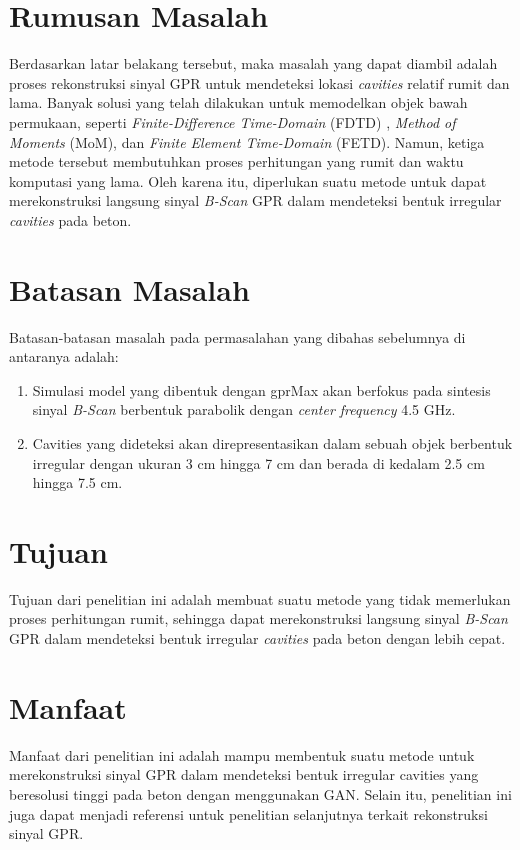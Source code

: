 \section{Rumusan Masalah}
\label{sec:rumusanmasalah}

Berdasarkan latar belakang tersebut, maka masalah yang dapat diambil adalah proses rekonstruksi sinyal GPR untuk mendeteksi lokasi \emph{cavities} relatif rumit dan lama. 
Banyak solusi yang telah dilakukan untuk memodelkan objek bawah permukaan, seperti \emph{Finite-Difference Time-Domain} (FDTD) \parencite{FDTD}, \emph{Method of Moments} (MoM)\parencite{MoM}, dan \emph{Finite Element Time-Domain} (FETD)\parencite{FETD}. 
Namun, ketiga metode tersebut membutuhkan proses perhitungan yang rumit dan waktu komputasi yang lama. 
Oleh karena itu, diperlukan suatu metode untuk dapat merekonstruksi langsung sinyal \emph{B-Scan} GPR dalam mendeteksi bentuk irregular \emph{cavities} pada beton.

\section{Batasan Masalah}
\label{sec:batasanmasalah}

Batasan-batasan masalah pada permasalahan yang dibahas sebelumnya di antaranya adalah:

\begin{enumerate}[nolistsep]

  \item Simulasi model yang dibentuk dengan gprMax akan berfokus pada sintesis sinyal \emph{B-Scan} berbentuk parabolik dengan \emph{center frequency} 4.5 GHz.

  \item Cavities yang dideteksi akan direpresentasikan dalam sebuah objek berbentuk irregular dengan ukuran 3 cm hingga 7 cm dan berada di kedalam 2.5 cm hingga 7.5 cm.

\end{enumerate}

\section{Tujuan}
\label{sec:Tujuan}

Tujuan dari penelitian ini adalah membuat suatu metode yang tidak memerlukan proses perhitungan rumit, sehingga dapat merekonstruksi langsung sinyal \emph{B-Scan} GPR dalam mendeteksi bentuk irregular \emph{cavities} pada beton dengan lebih cepat.

\section{Manfaat}
\label{sec:manfaat}

Manfaat dari penelitian ini adalah mampu membentuk suatu metode untuk merekonstruksi sinyal GPR dalam mendeteksi bentuk irregular cavities yang beresolusi tinggi pada beton dengan menggunakan GAN. Selain itu, penelitian ini juga dapat menjadi referensi untuk penelitian selanjutnya terkait rekonstruksi sinyal GPR.